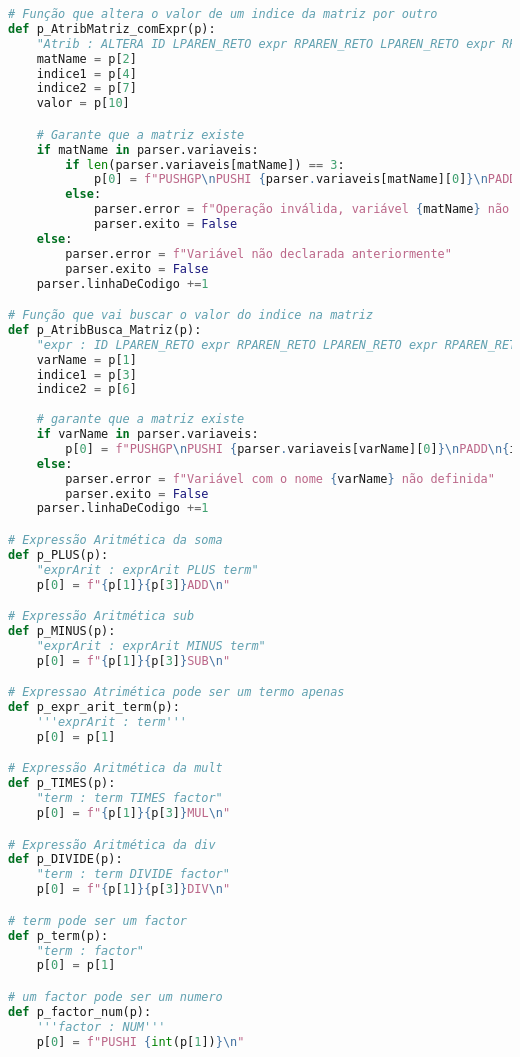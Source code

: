 \documentclass[11pt,a4paper]{report}
\begin{document}
\begin{scriptsize}
\begin{lstlisting}[language=python]
# Função que altera o valor de um indice da matriz por outro
def p_AtribMatriz_comExpr(p):
    "Atrib : ALTERA ID LPAREN_RETO expr RPAREN_RETO LPAREN_RETO expr RPAREN_RETO IGUAL expr PONTOVIRGULA" # altera mat[0][1] = 2;
    matName = p[2]
    indice1 = p[4]
    indice2 = p[7]
    valor = p[10]

    # Garante que a matriz existe
    if matName in parser.variaveis:
        if len(parser.variaveis[matName]) == 3:
            p[0] = f"PUSHGP\nPUSHI {parser.variaveis[matName][0]}\nPADD\n{indice1}PUSHI {parser.variaveis[matName][2]}\nMUL\nPADD\n{indice2}{valor}STOREN\n"
        else:
            parser.error = f"Operação inválida, variável {matName} não é uma matriz"
            parser.exito = False
    else:
        parser.error = f"Variável não declarada anteriormente"
        parser.exito = False
    parser.linhaDeCodigo +=1

# Função que vai buscar o valor do indice na matriz
def p_AtribBusca_Matriz(p):
    "expr : ID LPAREN_RETO expr RPAREN_RETO LPAREN_RETO expr RPAREN_RETO"                   # para usar tipo x = mat[1][2]
    varName = p[1]
    indice1 = p[3]
    indice2 = p[6]
    
    # garante que a matriz existe
    if varName in parser.variaveis:
        p[0] = f"PUSHGP\nPUSHI {parser.variaveis[varName][0]}\nPADD\n{indice1}PUSHI {parser.variaveis[varName][2]}\nMUL\nPADD\n{indice2}LOADN\n"
    else:
        parser.error = f"Variável com o nome {varName} não definida"
        parser.exito = False
    parser.linhaDeCodigo +=1

# Expressão Aritmética da soma
def p_PLUS(p):
    "exprArit : exprArit PLUS term"
    p[0] = f"{p[1]}{p[3]}ADD\n"

# Expressão Aritmética sub
def p_MINUS(p):
    "exprArit : exprArit MINUS term"
    p[0] = f"{p[1]}{p[3]}SUB\n"

# Expressao Atrimética pode ser um termo apenas
def p_expr_arit_term(p):
    '''exprArit : term'''
    p[0] = p[1]

# Expressão Aritmética da mult
def p_TIMES(p):
    "term : term TIMES factor"
    p[0] = f"{p[1]}{p[3]}MUL\n"

# Expressão Aritmética da div
def p_DIVIDE(p):
    "term : term DIVIDE factor"
    p[0] = f"{p[1]}{p[3]}DIV\n"

# term pode ser um factor
def p_term(p):
    "term : factor"
    p[0] = p[1]

# um factor pode ser um numero
def p_factor_num(p):
    '''factor : NUM'''
    p[0] = f"PUSHI {int(p[1])}\n"


\end{lstlisting}
\end{scriptsize}
\end{document}
